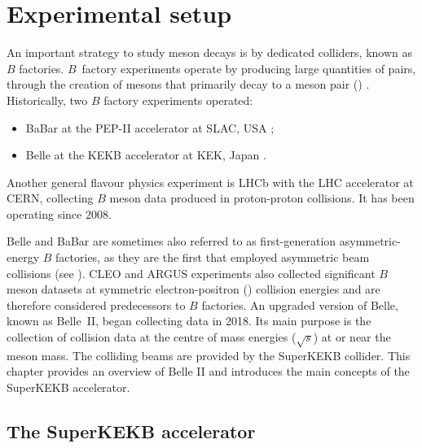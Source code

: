 \chapter{Experimental setup}\label{ch:belle2}

An important strategy to study \B meson decays is by dedicated colliders, known as $B$ factories.
$B$~factory experiments operate by producing large quantities of \BB pairs, through the creation of \FourS mesons that primarily decay to a \B meson pair (\BB) \cite{Workman:2022ynf}.
Historically, two $B$ factory experiments operated:
\begin{itemize}
    \item BaBar at the PEP-II accelerator at SLAC, USA \cite{BaBar:1995bns};
    \item Belle at the KEKB accelerator at KEK, Japan \cite{Belle:2000cnh}.
\end{itemize}
Another general flavour physics experiment is LHCb \cite{LHCb:2008vvz} with the LHC accelerator at CERN, 
collecting $B$ meson data produced in proton-proton collisions.
It has been operating since 2008.

Belle and BaBar are sometimes also referred to as first-generation asymmetric-energy $B$ factories, as they are the first that employed asymmetric beam collisions (see ).
CLEO \cite{CLEO:1982pvq} and ARGUS \cite{ARGUS:1988bds} experiments also collected significant $B$ meson datasets at symmetric electron-positron (\epem) collision energies and are therefore considered predecessors to $B$ factories. 
An upgraded version of Belle, known as Belle~II, began collecting data in 2018.
Its main purpose is the collection of \epem collision data 
at the centre of mass energies ($\sqrt{s}$) at or near the \FourS meson mass.
The colliding beams are provided by the SuperKEKB collider.
This chapter provides an overview of Belle II and introduces the main concepts of the SuperKEKB accelerator.

\section{The SuperKEKB accelerator}\label{sec:superkekb}

